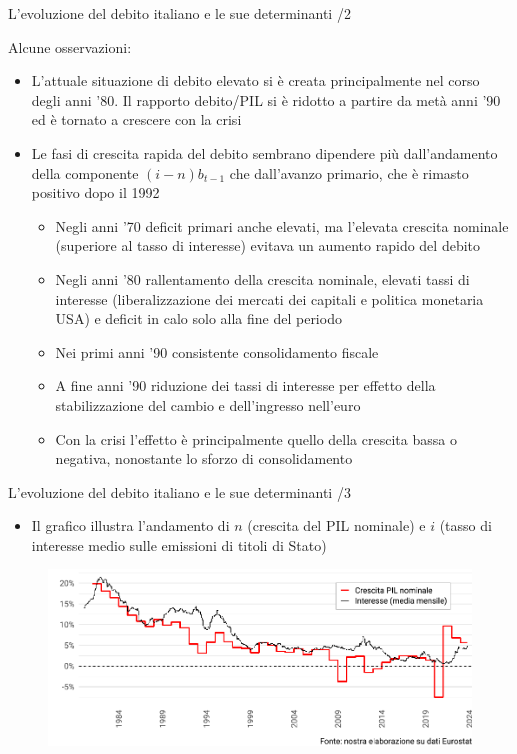 \documentclass[aspectratio=149,11pt,italian]{beamer}
\begin{document}
\begin{frame}{L'evoluzione del debito italiano e le sue determinanti /2}

  Alcune osservazioni:
  \begin{itemize}
  \item L'attuale situazione di debito elevato si è creata principalmente nel
    corso degli anni '80. Il rapporto debito/PIL si è ridotto a partire da
    metà anni '90 ed è tornato a crescere con la crisi
  \item Le fasi di crescita rapida del debito sembrano dipendere più
    dall'andamento della componente $(i-n)b_{t-1}$ che dall'avanzo primario,
    che è rimasto positivo dopo il 1992
    \begin{itemize}
    \item Negli anni '70 deficit primari anche elevati, ma l'elevata crescita
      nominale (superiore al tasso di interesse) evitava un aumento rapido del
      debito
    \item Negli anni '80 rallentamento della crescita nominale, elevati tassi
      di interesse (liberalizzazione dei mercati dei capitali e politica
      monetaria USA) e deficit in calo solo alla fine del periodo
    \item Nei primi anni '90 consistente consolidamento fiscale
    \item A fine anni '90 riduzione dei tassi di interesse per effetto della
      stabilizzazione del cambio e dell'ingresso nell'euro
    \item Con la crisi l'effetto è principalmente quello della crescita bassa
      o negativa, nonostante lo sforzo di consolidamento
    \end{itemize}
  \end{itemize}
\end{frame}

\begin{frame}{L'evoluzione del debito italiano e le sue determinanti /3}

  \begin{itemize}
  \item Il grafico illustra l'andamento di $n$ (crescita del PIL nominale) e
    $i$ (tasso di interesse medio sulle emissioni di titoli di Stato)
  \end{itemize}

  \begin{figure}
    \centering
    \includegraphics[width=\textwidth]{./figure/interesse-crescita-Italy-color.pdf}
  \end{figure}
\end{frame}
\end{document}
